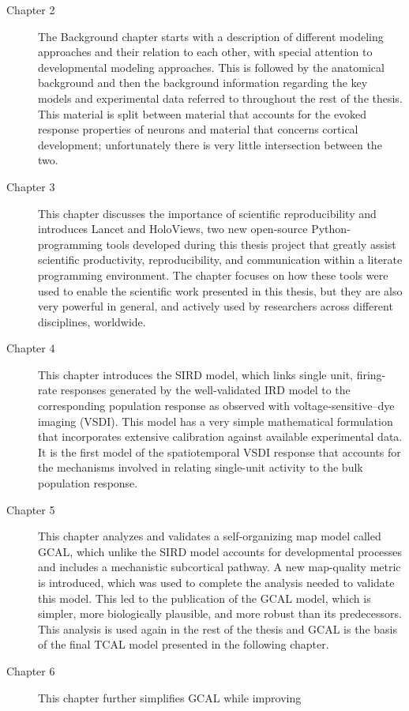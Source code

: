 \documentclass[phd,ianc,twoside]{infthesis}
\begin{document}
\begin{description}
\item[Chapter 2] The Background chapter starts with a description of
  different modeling approaches and their relation to each other, with
  special attention to developmental modeling approaches. This is
  followed by the anatomical background and then the background
  information regarding the key models and experimental data referred to
  throughout the rest of the thesis. This material is split between
  material that accounts for the evoked response properties of neurons
  and material that concerns cortical development; unfortunately there
  is very little intersection between the two.
\item[Chapter 3] This chapter discusses the importance of scientific
  reproducibility and introduces Lancet and HoloViews, two new open-source
  Python-programming tools developed during this thesis project that greatly assist 
  scientific productivity, reproducibility, and communication within a
  literate programming environment. The chapter focuses on how these
  tools were used to enable the scientific work presented in this
  thesis, but they are also very powerful in general, and actively
  used by researchers across different disciplines, worldwide.
\item[Chapter 4] This chapter introduces the SIRD model, which links
  single unit, firing-rate responses generated by the well-validated IRD
  model to the corresponding population response as observed with
  voltage-sensitive--dye imaging (VSDI). This model has a very simple
  mathematical formulation that incorporates extensive calibration
  against available experimental data. It is the first model of the
  spatiotemporal VSDI response that accounts for the mechanisms involved
  in relating single-unit activity to the bulk population response.
\item[Chapter 5] This chapter analyzes and validates a self-organizing
  map model called GCAL, which unlike the SIRD model accounts for
  developmental processes and includes a mechanistic subcortical
  pathway. A new map-quality metric is introduced, which was used to
  complete the analysis needed to validate this model. This led to the
  publication of the GCAL model, which is simpler, more biologically
  plausible, and more robust than its predecessors. This analysis is used
  again in the rest of the thesis and GCAL is the basis of the final
  TCAL model presented in the following chapter.
\item[Chapter 6] This chapter further simplifies GCAL while improving

\end{description}
\end{document}

